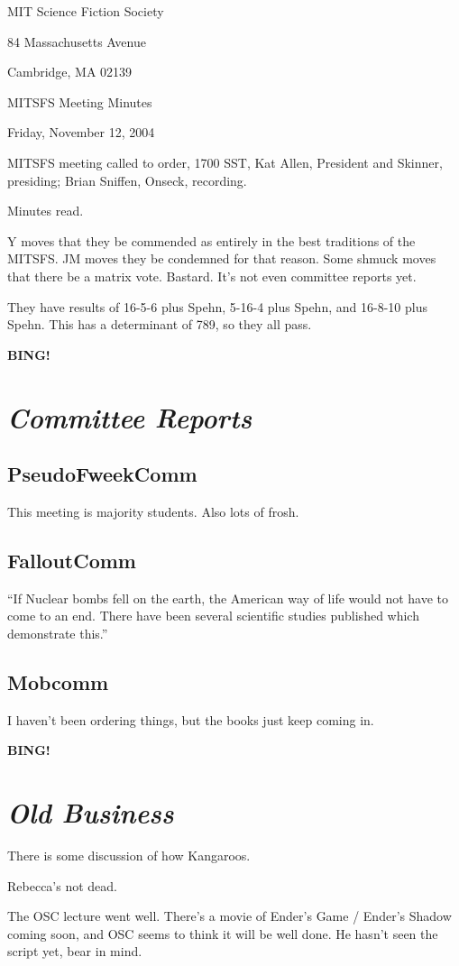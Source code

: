 \documentclass[10pt]{article}
\newcommand{\bing}{{\bf BING!} }
\newcommand{\goto}[1]{\bing \vskip 12pt \section*{{\em{#1}}}}
\newcommand{\ps}{ plus Spehn\xspace}
\begin{document}
\begin{center}

MIT Science Fiction Society

84 Massachusetts Avenue

Cambridge, MA 02139

\vspace{12pt}

MITSFS Meeting Minutes

Friday, November 12, 2004

\end{center}

\vspace{18pt}

\setlength{\parskip}{6pt}

\noindent
MITSFS meeting called to order, 1700 SST, Kat Allen, President and
Skinner, presiding; Brian Sniffen,  Onseck, recording.

Minutes read.

Y moves that they be commended as entirely in the best traditions of
the MITSFS.  JM moves they be condemned for that reason.  Some shmuck
moves that there be a matrix vote.  Bastard.  It's not even committee
reports yet.

They have results of 16-5-6\ps, 5-16-4\ps, and 16-8-10\ps.  This has a
determinant of 789, so they all pass.

\goto{Committee Reports}
\subsection*{PseudoFweekComm}
This meeting is majority students.  Also lots of frosh.

\subsection*{FalloutComm}
``If Nuclear bombs fell on the earth, the American way of life would not
have to come to an end.  There have been several scientific studies
published which demonstrate this.''

\subsection*{Mobcomm}
I haven't been ordering things, but the books just keep coming in.

\goto{Old Business}
There is some discussion of how Kangaroos.

Rebecca's not dead.

The OSC lecture went well.  There's a movie of Ender's Game / Ender's
Shadow coming soon, and OSC seems to think it will be well done.  He
hasn't seen the script yet, bear in mind.
\end{document}
